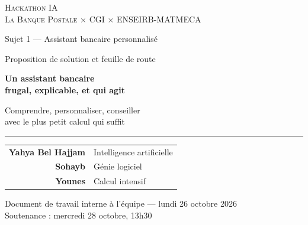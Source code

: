 \documentclass[11pt,a4paper]{report}
\begin{document}
\begin{titlepage}
\centering
\vspace*{0.6cm}
{\large\scshape\color{darkgray} Hackathon IA\\[0.15cm]
La Banque Postale $\times$ CGI $\times$ ENSEIRB-MATMECA\par}
\vspace{0.3cm}
{\normalsize\color{darkgray} Sujet 1 --- Assistant bancaire personnalisé\par}

\vspace{2.6cm}
{\large\color{darkgray} Proposition de solution et feuille de route\par}
\vspace{0.5cm}
{\Huge\bfseries\color{mainblue} Un assistant bancaire\\[0.25cm] frugal, explicable, et qui agit\par}
\vspace{0.6cm}
{\Large Comprendre, personnaliser, conseiller\\[0.1cm]
avec le plus petit calcul qui suffit\par}

\vspace{1.8cm}
\rule{0.78\textwidth}{0.7pt}
\vspace{1.1cm}

\begin{tabular}{rl}
\textbf{Yahya Bel Hajjam} & Intelligence artificielle \\[0.15cm]
\textbf{Sohayb} & Génie logiciel \\[0.15cm]
\textbf{Younes} & Calcul intensif \\
\end{tabular}

\vfill
{\small\color{darkgray} Document de travail interne à l'équipe --- lundi 26 octobre 2026\\
Soutenance : mercredi 28 octobre, 13h30\par}
\end{titlepage}

\tableofcontents
\cleardoublepage















\appendix

\end{document}
